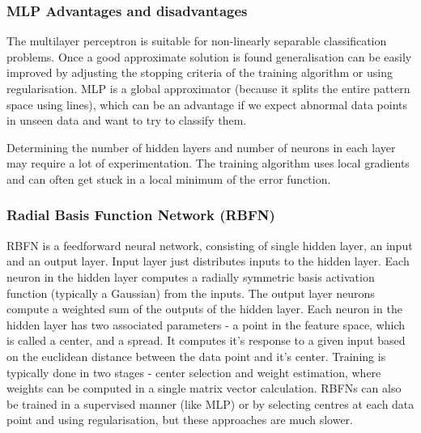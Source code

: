 \documentclass[a4paper, 11pt]{article}
\begin{document}
\subsubsection{MLP Advantages and disadvantages}
The multilayer perceptron is suitable for non-linearly separable classification problems. Once a good approximate solution is found generalisation can be easily improved by adjusting the stopping criteria of the training algorithm or using regularisation. MLP is a global approximator (because it splits the entire pattern space using lines), which can be an advantage if we expect abnormal data points in unseen data and want to try to classify them. 

Determining the number of hidden layers and number of neurons in each layer may require a lot of experimentation. The training algorithm uses local gradients and can often get stuck in a local minimum of the error function. 


\subsubsection{Radial Basis Function Network (RBFN)}
RBFN is a feedforward neural network, consisting of single hidden layer, an input and an output layer. Input layer just distributes inputs to the hidden layer. Each neuron in the hidden layer computes a radially symmetric basis activation function (typically a Gaussian) from the inputs. The output layer neurons compute a weighted sum of the outputs of the hidden layer. Each neuron in the hidden layer has two associated parameters - a point in the feature space, which is called a center, and a spread. It computes it's response to a given input based on the euclidean distance between the data point and it's center. Training is typically done in two stages - center selection and weight estimation, where weights can be computed in a single matrix vector calculation. RBFNs can also be trained in a supervised manner (like MLP) or by selecting centres at each data point and using regularisation, but these approaches are much slower.
\end{document}
